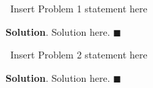 \documentclass[12pt]{article}
\newenvironment{solution}{%
        \begin{trivlist} \item \textbf{Solution}. }{%
            \hspace*{\fill} $\blacksquare$\end{trivlist}}%
\begin{document}
\begin{problem} 
    \ Insert Problem 1 statement here 
\end{problem}
\begin{solution}
    Solution here.
\end{solution}

\begin{problem} 
    \ Insert Problem 2 statement here 
\end{problem}
\begin{solution}
    Solution here.
\end{solution}
\end{document}
